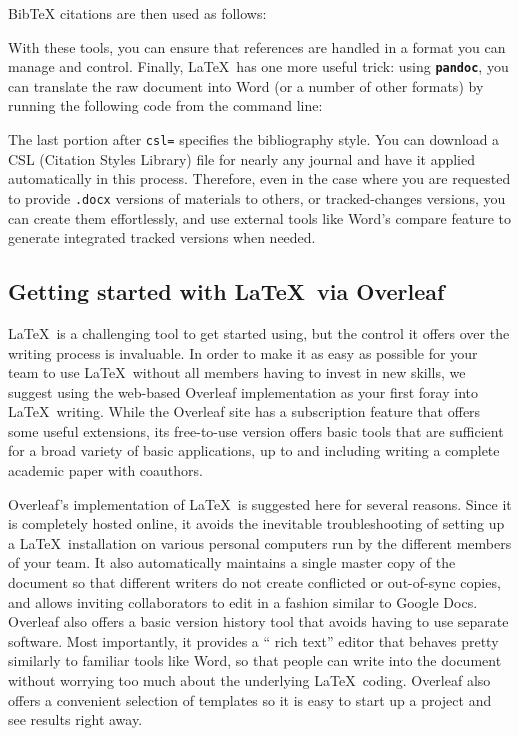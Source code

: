 
\noindent BibTeX citations are then used as follows:


With these tools, you can ensure that references are handled
in a format you can manage and control.\cite{flom2005latex}
Finally, \LaTeX\ has one more useful trick:
using \textbf{\texttt{pandoc}},
you can translate the raw document into Word
(or a number of other formats)
by running the following code from the command line:


\noindent The last portion after \texttt{csl=} specifies the bibliography style.
You can download a CSL (Citation Styles Library) file
for nearly any journal and have it applied automatically in this process.
Therefore, even in the case where you are requested to provide
\texttt{.docx} versions of materials to others, or tracked-changes versions,
you can create them effortlessly,
and use external tools like Word's compare feature
to generate integrated tracked versions when needed.

\subsection{Getting started with \LaTeX\ via Overleaf}

\LaTeX\ is a challenging tool to get started using,
but the control it offers over the writing process is invaluable.
In order to make it as easy as possible for your team
to use \LaTeX\ without all members having to invest in new skills,
we suggest using the web-based Overleaf implementation as your first foray into \LaTeX\ writing.
While the Overleaf site has a subscription feature that offers some useful extensions,
its free-to-use version offers basic tools that are sufficient
for a broad variety of basic applications,
up to and including writing a complete academic paper with coauthors.

Overleaf's implementation of \LaTeX\ is suggested here for several reasons.
Since it is completely hosted online,
it avoids the inevitable troubleshooting of setting up a \LaTeX\ installation
on various personal computers run by the different members of your team.
It also automatically maintains a single master copy of the document
so that different writers do not create conflicted or out-of-sync copies,
and allows inviting collaborators to edit in a fashion similar to Google Docs.
Overleaf also offers a basic version history tool that avoids having to use separate software.
Most importantly, it provides a `` rich text'' editor
that behaves pretty similarly to familiar tools like Word,
so that people can write into the document without worrying too much
about the underlying \LaTeX\ coding.
Overleaf also offers a convenient selection of templates
so it is easy to start up a project and see results right away.

